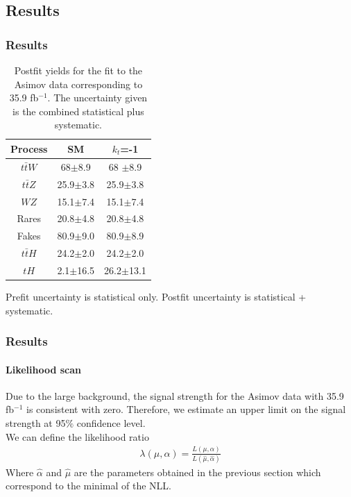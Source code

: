 \documentclass[11pt]{beamer}
\begin{document}
\begin{frame}
\section{Results}
\frametitle{Results}
	\begin{table}[ht!]
		\centering
		\caption*{Postfit yields for the fit to the Asimov data corresponding to 35.9 fb$^{-1}$. The uncertainty given is the combined statistical plus systematic.}
		\begin{tabular}{ccc}
			\hline
			Process & SM & $k_{t}$=-1 \\
			\hline
			$t\bar{t}W$ & 68$\pm$8.9& 68 $\pm$8.9 \\
			$t\bar{t}Z$ & 25.9$\pm$3.8&25.9$\pm$3.8\\
			$WZ$ & 15.1$\pm$7.4& 15.1$\pm$7.4\\
			Rares & 20.8$\pm$4.8& 20.8$\pm$4.8 \\
			Fakes & 80.9$\pm$9.0& 80.9$\pm$8.9 \\
			$t\bar{t}H$ & 24.2$\pm$2.0 & 24.2$\pm$2.0 \\
			\hline
			$tH$& 2.1$\pm$16.5 &26.2$\pm$13.1 
		\end{tabular}
		\label{table1}
	\end{table}
 Prefit uncertainty is statistical only. Postfit uncertainty is statistical + systematic.
\end{frame}



\begin{frame}
\frametitle{Results}
\framesubtitle{Likelihood scan}
Due to the large background, the signal strength for the Asimov data with 35.9 fb$^{-1}$ is consistent with zero.
Therefore, we estimate an upper limit on the signal strength at 95$\%$ confidence level.\\

We can define the likelihood ratio
\begin{align}
\lambda(\mu,\alpha)=\frac{L(\mu,\alpha)}{L(\hat{\mu},\hat{\alpha})}
\end{align}
Where $\hat{\alpha}$ and $\hat{\mu}$ are the parameters obtained in the previous section which correspond to the minimal of the NLL.
\end{frame}
\end{document}

